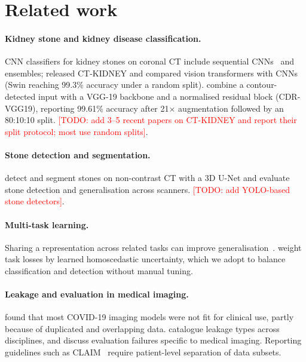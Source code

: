 \documentclass[11pt]{article}
\newcommand{\todo}[1]{\textcolor{red}{[TODO: #1]}}
\begin{document}
\section{Related work}
\paragraph{Kidney stone and kidney disease classification.}
CNN classifiers for kidney stones on coronal CT include sequential CNNs~\citep{yildirim2021deep} and ensembles;
\citet{islam2022vision} released CT-KIDNEY and compared vision transformers with CNNs (Swin reaching
99.3\% accuracy under a random split). \citet{devi2025cdr} combine a contour-detected input with a VGG-19
backbone and a normalised residual block (CDR-VGG19), reporting 99.61\% accuracy after 21$\times$
augmentation followed by an 80:10:10 split. \todo{add 3--5 recent papers on CT-KIDNEY and report their split
protocol; most use random splits}.

\paragraph{Stone detection and segmentation.}
\citet{elton2022deep} detect and segment stones on non-contrast CT with a 3D U-Net and \citet{parakh2019urinary}
evaluate stone detection and generalisation across scanners. \todo{add YOLO-based stone detectors}.

\paragraph{Multi-task learning.}
Sharing a representation across related tasks can improve generalisation~\citep{caruana1997multitask}.
\citet{kendall2018multi} weight task losses by learned homoscedastic uncertainty, which we adopt to balance
classification and detection without manual tuning.

\paragraph{Leakage and evaluation in medical imaging.}
\citet{roberts2021pitfalls} found that most COVID-19 imaging models were not fit for clinical use, partly
because of duplicated and overlapping data. \citet{kapoor2023leakage} catalogue leakage types across
disciplines, and \citet{varoquaux2022failures} discuss evaluation failures specific to medical imaging.
Reporting guidelines such as CLAIM~\citep{mongan2020claim} require patient-level separation of data subsets.
\end{document}
